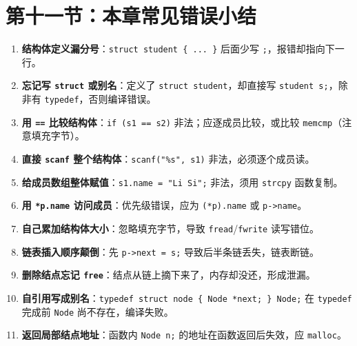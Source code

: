 \section{第十一节：本章常见错误小结}
\begin{enumerate}
  \item \textbf{结构体定义漏分号}：\texttt{struct student \{ ... \}} 后面少写 \texttt{;}，报错却指向下一行。
  \item \textbf{忘记写 \texttt{struct} 或别名}：定义了 \texttt{struct student}，却直接写 \texttt{student s;}，除非有 \texttt{typedef}，否则编译错误。
  \item \textbf{用 \texttt{==} 比较结构体}：\texttt{if (s1 == s2)} 非法；应逐成员比较，或比较 \texttt{memcmp}（注意填充字节）。
  \item \textbf{直接 \texttt{scanf} 整个结构体}：\texttt{scanf("\%s", s1)} 非法，必须逐个成员读。
  \item \textbf{给成员数组整体赋值}：\texttt{s1.name = "Li Si";} 非法，须用 \texttt{strcpy} 函数复制。
  \item \textbf{用 \texttt{*p.name} 访问成员}：优先级错误，应为 \texttt{(*p).name} 或 \texttt{p->name}。
  \item \textbf{自己累加结构体大小}：忽略填充字节，导致 \texttt{fread}/\texttt{fwrite} 读写错位。
  \item \textbf{链表插入顺序颠倒}：先 \texttt{p->next = s;} 导致后半条链丢失，链表断链。
  \item \textbf{删除结点忘记 \texttt{free}}：结点从链上摘下来了，内存却没还，形成泄漏。
  \item \textbf{自引用写成别名}：\texttt{typedef struct node \{ Node *next; \} Node;} 在 \texttt{typedef} 完成前 \texttt{Node} 尚不存在，编译失败。
  \item \textbf{返回局部结点地址}：函数内 \texttt{Node n;} 的地址在函数返回后失效，应 \texttt{malloc}。
\end{enumerate}
